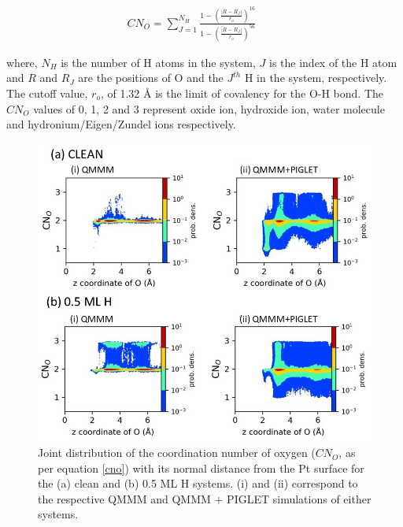 \begin{align}
\label{cno}
CN_{O} = \sum_{J=1}^{N_H} \frac{1-(\frac{|R-R_J|}{r_o})^{16}} {1-(\frac{|R-R_J|}{r_o})^{56}} \hspace{1cm}  
\end{align}

\noindent where, $N_H$ is the number of H atoms in the system, $J$ is the index of the H atom and  $R$ and $R_J$ are the positions of O and the $J^{th}$ H in the system,
respectively. The cutoff value, $r_o$, of 1.32 \AA{} is the limit of covalency for the O-H bond. The $CN_{O}$ values of 0, 1, 2 and 3 represent oxide ion, hydroxide ion, water molecule and hydronium/Eigen/Zundel ions respectively. 

\begin{figure}
   \begin{center}
    \includegraphics[width=15cm]{./Chapter3/figures/Slide2.JPG}       
   \end{center}
    \caption{Joint distribution of the coordination number of oxygen ($CN_{O}$, as per equation \ref{cno}) with its normal distance from the Pt surface for the (a) clean and (b) 0.5 ML H systems. (i) and (ii) correspond to the respective QMMM and QMMM $+$ PIGLET simulations of either systems.}
  \label{fig:Slide2}
\end{figure}

